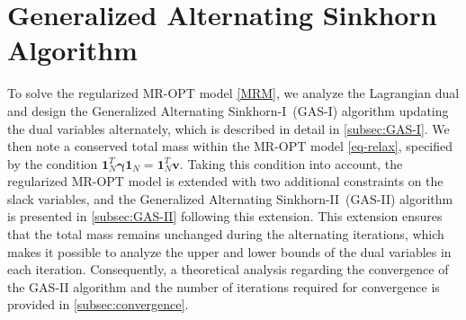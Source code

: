 \documentclass[review,hidelinks,onefignum,onetabnum]{siamart220329}
\begin{document}
\section{Generalized Alternating Sinkhorn Algorithm}\label{MRM-alg}
To solve the regularized MR-OPT model \cref{MRM}, we analyze the Lagrangian dual and design the Generalized Alternating Sinkhorn-I~(GAS-I) algorithm updating the dual variables alternately, which is described in detail in \cref{subsec:GAS-I}.
We then note a conserved total mass within the MR-OPT model \cref{eq-relax}, specified by the condition $\bm{1}_N^T\bm{\gamma}\bm{1}_N=\bm{1}_N^T\bm{v}$. 
Taking this condition into account, the regularized MR-OPT model is extended with two additional constraints on the slack variables, and the Generalized Alternating Sinkhorn-II~(GAS-II) algorithm is presented in \cref{subsec:GAS-II} following this extension.
This extension ensures that the total mass remains unchanged during the alternating iterations, which makes it possible to analyze the upper and lower bounds of the dual variables in each iteration. 
Consequently, a theoretical analysis regarding the convergence of the GAS-II algorithm and the number of iterations required for convergence is provided in \cref{subsec:convergence}.
\end{document}
